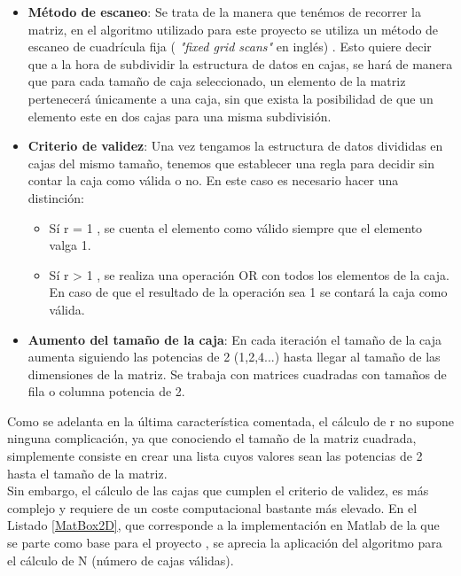 \begin{itemize}
    \item \textbf{Método de escaneo}: Se trata de la manera que tenémos de recorrer la matriz, en el algoritmo utilizado para este proyecto se utiliza un método de escaneo de cuadrícula fija ( \textit{"fixed grid scans"} en inglés) \cite{unknown-author-no-dateF}. Esto quiere decir que a la hora de subdividir la estructura de datos en cajas, se hará de manera que para cada tamaño de caja seleccionado, un elemento de la matriz pertenecerá únicamente a una caja, sin que exista la posibilidad de que un elemento este en dos cajas para una misma subdivisión.
    \item \textbf{Criterio de validez}: Una vez tengamos la estructura de datos divididas en cajas del mismo tamaño, tenemos que establecer una regla para decidir sin contar la caja como válida o no. En este caso es necesario hacer una distinción:
    \begin{itemize}
        \item Sí  r = 1 , se cuenta el elemento como válido siempre que el elemento valga 1.
        \item Sí  r > 1 , se realiza una operación OR con todos los elementos de la caja. En caso de que el resultado de la operación sea 1 se contará la caja como válida. 
    \end{itemize}
    \item \textbf{Aumento del tamaño de la caja}: En cada iteración el tamaño de la caja aumenta siguiendo las potencias de 2 (1,2,4...) hasta llegar al tamaño de las dimensiones de la matriz. Se trabaja con matrices cuadradas con tamaños de fila o columna potencia de 2.
\end{itemize}


Como se adelanta en la última característica comentada, el cálculo de r no supone ninguna complicación, ya que conociendo el tamaño de la matriz cuadrada, simplemente consiste en crear una lista cuyos valores sean las potencias de 2 hasta el tamaño de la matriz.\\

Sin embargo, el cálculo de las cajas que cumplen el criterio de validez, es más complejo y requiere de un coste computacional bastante más elevado. En el Listado \ref{MatBox2D}, que corresponde a la implementación en Matlab de la que se parte como base para el proyecto \cite{unknown-author-2008}, se aprecia la aplicación del algoritmo para el cálculo de N (número de cajas válidas).\\

